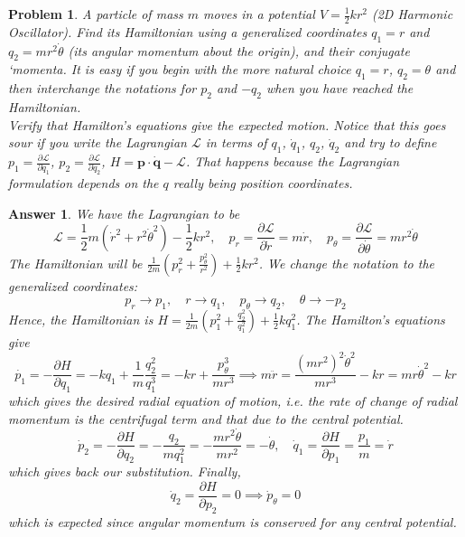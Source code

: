 \documentclass[a4paper]{article}
\newtheorem{ans}{Answer}[subsection]
\theoremstyle{new}
\newtheorem{qns}{Problem}[section]
\begin{document}
\newpage
\begin{qns}
A particle of mass $m$ moves in a potential $V=\frac{1}{2}kr^2$ (2D Harmonic Oscillator). Find its Hamiltonian using a generalized coordinates $q_1=r$ and $q_2=mr^2\dot{\theta}$ (its angular momentum about the origin), and their conjugate `momenta. It is easy if you begin with the more natural choice $q_1=r$, $q_2=\theta$ and then interchange the notations for $p_2$ and $-q_2$ when you have reached the Hamiltonian.\\[5pt]
Verify that Hamilton's equations give the expected motion. Notice that this goes sour if you write the Lagrangian $\mathcal{L}$ in terms of $q_1$, $\dot{q}_1$, $q_2$, $\dot{q}_2$ and try to define $p_1=\frac{\partial\mathcal{L}}{\partial\dot{q}_1}$, $p_2=\frac{\partial\mathcal{L}}{\partial\dot{q}_2}$, $H=\mathbf{p}\cdot\mathbf{\dot{q}}-\mathcal{L}$. That happens because the Lagrangian formulation depends on the $q$ really being position coordinates.
\end{qns}
\begin{ans}
We have the Lagrangian to be
$$\mathcal{L}=\frac{1}{2}m(\dot{r}^2+r^2\dot{\theta}^2)-\frac{1}{2}kr^2,\quad p_r=\frac{\partial\mathcal{L}}{\partial\dot{r}}=m\dot{r},\quad p_\theta=\frac{\partial\mathcal{L}}{\partial\dot{\theta}}=mr^2\dot{\theta}$$
The Hamiltonian will be $\frac{1}{2m}(p_r^2+\frac{p_\theta^2}{r^2})+\frac{1}{2}kr^2$. We change the notation to the generalized coordinates:
$$p_r\rightarrow p_1,\quad r\rightarrow q_1,\quad p_\theta\rightarrow q_2,\quad\theta\rightarrow -p_2$$
Hence, the Hamiltonian is $H=\frac{1}{2m}(p_1^2+\frac{q_2^2}{q_1^2})+\frac{1}{2}kq_1^2$. The Hamilton's equations give
$$\dot{p_1}=-\frac{\partial H}{\partial q_1}=-kq_1+\frac{1}{m}\frac{q_2^2}{q_1^3}=-kr+\frac{p_\theta^3}{mr^3}\implies m\ddot{r}=\frac{(mr^2)^2\dot{\theta}^2}{mr^3}-kr=mr\dot{\theta}^2-kr$$
which gives the desired radial equation of motion, i.e. the rate of change of radial momentum is the centrifugal term and that due to the central potential.
$$\dot{p}_2=-\frac{\partial H}{\partial q_2}=-\frac{q_2}{mq_1^2}=-\frac{mr^2\dot{\theta}}{mr^2}=-\dot{\theta},\quad\dot{q}_1=\frac{\partial H}{\partial p_1}=\frac{p_1}{m}=\dot{r}$$
which gives back our substitution. Finally,
$$\dot{q}_2=\frac{\partial H}{\partial p_2}=0\implies\dot{p}_\theta=0$$
which is expected since angular momentum is conserved for any central potential.
\end{ans}
\end{document}
